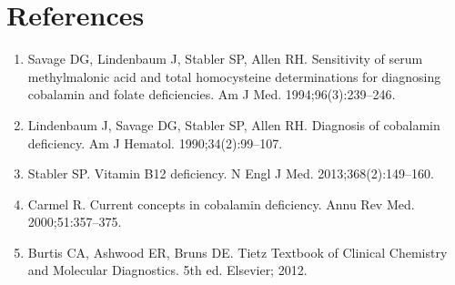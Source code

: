 \section*{References}
\begin{enumerate}
  \item Savage DG, Lindenbaum J, Stabler SP, Allen RH. Sensitivity of serum methylmalonic acid and total homocysteine determinations for diagnosing cobalamin and folate deficiencies. Am J Med. 1994;96(3):239--246.
  \item Lindenbaum J, Savage DG, Stabler SP, Allen RH. Diagnosis of cobalamin deficiency. Am J Hematol. 1990;34(2):99--107.
  \item Stabler SP. Vitamin B12 deficiency. N Engl J Med. 2013;368(2):149--160.
  \item Carmel R. Current concepts in cobalamin deficiency. Annu Rev Med. 2000;51:357--375.
  \item Burtis CA, Ashwood ER, Bruns DE. Tietz Textbook of Clinical Chemistry and Molecular Diagnostics. 5th ed. Elsevier; 2012.
\end{enumerate}
\clearpage
